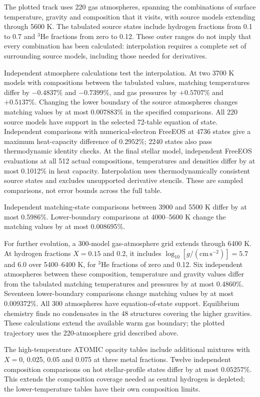 \documentclass[11pt,letterpaper]{article}
\begin{document}
The plotted track uses 220 gas atmospheres, spanning the combinations of
surface temperature, gravity and composition that it visits, with source
models extending through 5600 K.
The tabulated source states include hydrogen fractions from 0.1 to 0.7 and
$^3$He fractions from zero to 0.12. These outer ranges do not imply that every
combination has been calculated: interpolation requires a complete set of
surrounding source models, including those needed for derivatives.

Independent atmosphere calculations test the interpolation. At two 3700 K
models with compositions between the tabulated values, matching temperatures
differ by $-0.4837\%$ and $-0.7399\%$, and gas pressures by $+0.5707\%$
and $+0.5137\%$. Changing the lower boundary of the source atmospheres
changes matching values by at most $0.007883\%$ in the specified comparisons.
All 220 source models have support in the selected 72-table equation of state.
Independent comparisons with numerical-electron FreeEOS at 4736 states give
a maximum heat-capacity difference of $0.2952\%$; 2240 states also pass
thermodynamic identity checks. At the final stellar model, independent
FreeEOS evaluations at all 512 actual compositions, temperatures and densities
differ by at most 0.1012\% in heat capacity. Interpolation uses thermodynamically
consistent source states and excludes unsupported derivative stencils.
These are sampled comparisons, not error bounds across the full table.

Independent matching-state comparisons between 3900 and 5500 K differ by at
most 0.5986\%. Lower-boundary comparisons at 4000--5600 K change the matching
values by at most 0.008695\%.

For further evolution, a 300-model gas-atmosphere grid extends through
6400 K. At hydrogen fractions $X=0.15$ and 0.2, it includes
$\log_{10}[g/(\mathrm{cm\,s^{-2}})]=5.7$ and 6.0 over 5400--6400 K,
for $^3$He fractions of zero and 0.12. Six independent atmospheres between
these composition, temperature and gravity values differ from the tabulated
matching temperatures and pressures by at most 0.4860\%. Seventeen
lower-boundary comparisons change matching values by at most 0.009372\%.
All 300 atmospheres have equation-of-state support. Equilibrium chemistry
finds no condensates in the 48 structures covering the higher gravities.
These calculations extend the available warm gas boundary; the plotted
trajectory uses the 220-atmosphere grid described above.

The high-temperature ATOMIC opacity tables include additional mixtures with
$X=0$, 0.025, 0.05 and 0.075 at three metal fractions. Twelve independent
composition comparisons on hot stellar-profile states differ by at most
$0.05257\%$. This extends the composition coverage needed as central hydrogen
is depleted; the lower-temperature tables have their own composition limits.
\end{document}
